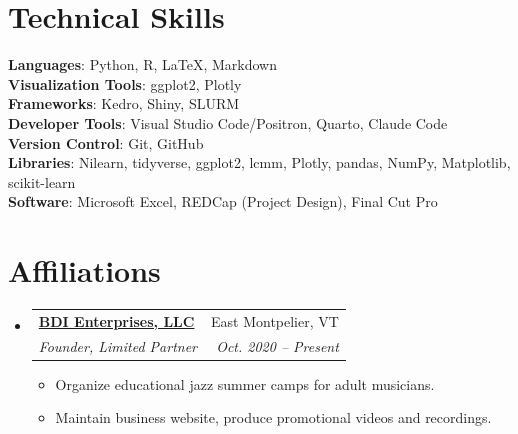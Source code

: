 \documentclass[letterpaper,11pt]{article}
\makeatletter
\newcommand{\resumeItem}[1]{
  \item\small{
    {#1 \vspace{-2pt}}
  }
}
\newcommand{\resumeSubheading}[4]{
  \vspace{-2pt}\item
    \begin{tabular*}{0.97\textwidth}[t]{l@{\extracolsep{\fill}}r}
      \textbf{#1} & #2 \\
      \textit{\small#3} & \textit{\small #4} \\
    \end{tabular*}\vspace{-7pt}
}
\newcommand{\resumeSubHeadingListStart}{\begin{itemize}[leftmargin=0.15in, label={}]}
\newcommand{\resumeSubHeadingListEnd}{\end{itemize}}
\newcommand{\resumeItemListStart}{\begin{itemize}}
\newcommand{\resumeItemListEnd}{\end{itemize}\vspace{-5pt}}
\makeatother
\begin{document}
\section{Technical Skills}
\begin{itemize}[leftmargin=0.15in, label={}]
	\small{\item{
			\textbf{Languages}{: Python, R, \LaTeX, Markdown} \\
			\textbf{Visualization Tools}{: ggplot2, Plotly} \\
			\textbf{Frameworks}{: Kedro, Shiny, SLURM} \\
			\textbf{Developer Tools}{: Visual Studio Code/Positron, Quarto, Claude Code} \\
			\textbf{Version Control}{: Git, GitHub} \\
			\textbf{Libraries}{: Nilearn, tidyverse, ggplot2, lcmm, Plotly, pandas, NumPy, Matplotlib, scikit-learn} \\
			\textbf{Software}{: Microsoft Excel, REDCap (Project Design), Final Cut Pro}
	}}
\end{itemize}

\section{Affiliations}
	\resumeSubHeadingListStart
		\resumeSubheading{\href{https://www.jazzinthemountains.com/}{BDI Enterprises, LLC}
		}
		{East Montpelier, VT}
		{Founder, Limited Partner}{Oct. 2020 -- Present}
		\resumeItemListStart
		    \resumeItem{Organize educational jazz summer camps for adult musicians.}
		    \resumeItem{Maintain business website, produce promotional videos and recordings.}
		\resumeItemListEnd
	\resumeSubHeadingListEnd
	

%
\end{document}
